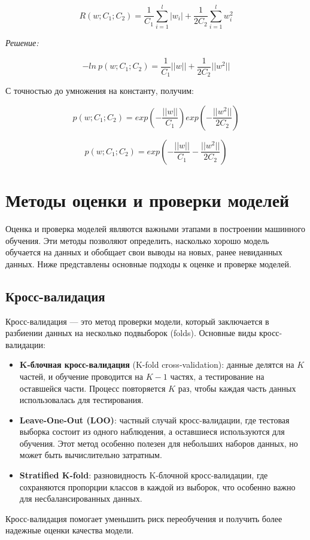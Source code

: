 \[
R(w;C_{1};C_{2}) = \frac{1}{C_{1}}\sum_{i=1}^{l}{|w_{i}|} + \frac{1}{2C_{2}}\sum_{i=1}^{l}{w_{i}^{2}}
\]

\textit{Решение:}

\[
-ln \ p(w;C_{1};C_{2}) = \frac{1}{C_{1}}||w|| + \frac{1}{2C_{2}}||w^2||
\]

С точностью до умножения на константу, получим:

\[
p(w;C_{1};C_{2}) = exp(-\frac{||w||}{C_{1}})exp(-\frac{||w^2||}{2C_{2}})
\]

\[
p(w;C_{1};C_{2}) = exp(-\frac{||w||}{C_{1}}-\frac{||w^2||}{2C_{2}})
\]


\section{Методы оценки и проверки моделей}

Оценка и проверка моделей являются важными этапами в построении машинного обучения. Эти методы позволяют определить, насколько хорошо модель обучается на данных и обобщает свои выводы на новых, ранее невиданных данных. Ниже представлены основные подходы к оценке и проверке моделей.

\subsection*{Кросс-валидация}
Кросс-валидация --- это метод проверки модели, который заключается в разбиении данных на несколько подвыборок (folds). Основные виды кросс-валидации:
\begin{itemize}
    \item \textbf{K-блочная кросс-валидация} (K-fold cross-validation): данные делятся на $K$ частей, и обучение проводится на $K-1$ частях, а тестирование на оставшейся части. Процесс повторяется $K$ раз, чтобы каждая часть данных использовалась для тестирования.
    \item \textbf{Leave-One-Out (LOO)}: частный случай кросс-валидации, где тестовая выборка состоит из одного наблюдения, а оставшиеся используются для обучения. Этот метод особенно полезен для небольших наборов данных, но может быть вычислительно затратным.
    \item \textbf{Stratified K-fold}: разновидность K-блочной кросс-валидации, где сохраняются пропорции классов в каждой из выборок, что особенно важно для несбалансированных данных.
\end{itemize}

Кросс-валидация помогает уменьшить риск переобучения и получить более надежные оценки качества модели.

